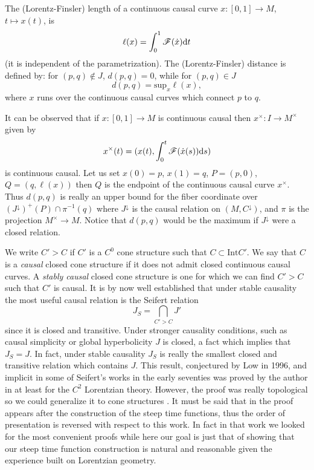 \documentclass[a4paper]{jpconf}
\theoremstyle{definition}
\theoremstyle{remark}
\newcommand{\dd}{{\rm d}}
\begin{document}
The (Lorentz-Finsler) length of a continuous causal curve $x\colon [0,1]\to M$, $t \mapsto x(t)$, is \[\ell(x)=\int_0^1 \mathscr{F}(\dot x) \dd t\]
(it is independent of the parametrization).   The (Lorentz-Finsler) distance is defined by: for $(p,q) \notin J$,  $d(p,q)=0$, while for $(p,q)\in J$
\begin{equation}
d(p,q)=\textrm{sup}_x \ell(x) ,
\end{equation}
where $x$ runs over the continuous causal curves which connect $p$ to $q$.

It can be observed that if $x\colon [0,1]\to M$ is continuous causal then $x^\times\colon I \to M^\times$ given by
\[
x^\times(t)=(x(t), \int_0^t \mathscr{F}(\dot x(s)) \dd s)
\]
is continuous causal. Let us set  $x(0)=p$, $x(1)=q$, $P=(p,0)$, $Q=(q, \ell(x))$ then $Q$ is the endpoint of the continuous causal curve $x^\times$. Thus $d(p,q)$ is really an upper bound for the fiber coordinate over $(J^\downarrow)^+(P)\cap \pi^{-1}(q)$ where $J^\downarrow$ is the causal relation on  $(M,C^\downarrow)$, and $\pi$ is the projection  $M^\times\to M$. Notice that $d(p,q)$ would be the maximum if $J^\downarrow$ were a closed relation.

We write $C'>C$ if $C'$ is a $C^0$ cone structure such that $ C\subset \textrm{Int} C'$.
We say that $C$ is a {\em causal} closed cone structure if it does not admit closed continuous causal curves.
A {\em stably causal}  closed cone structure is one for which we can find $C'>C$ such that $C'$ is causal. It is by now well established that under stable causality the most useful causal relation is the Seifert relation
\[
J_S=\bigcap_{C'>C} J'
\]
since it is closed and transitive. Under stronger causality conditions, such as causal simplicity or global hyperbolicity $J$ is closed, a fact which implies that $J_S=J$. In fact, under stable causality $J_S$ is really the smallest closed and transitive relation which contains $J$. This result, conjectured by Low in 1996, and implicit in some of Seifert's works in the early seventies was proved by the author in \cite{minguzzi08b} at least for the $C^2$ Lorentzian theory. However, the proof was really  topological so we could generalize it to cone structures  \cite{minguzzi17}.
It must be said that in \cite{minguzzi17} the proof appears after the construction of the steep time functions, thus the order of presentation is reversed with respect to this work. In fact in that work we looked for the most  convenient proofs while here our goal is just that of  showing that our steep time function construction is natural and reasonable given the experience built on Lorentzian geometry.
\end{document}
